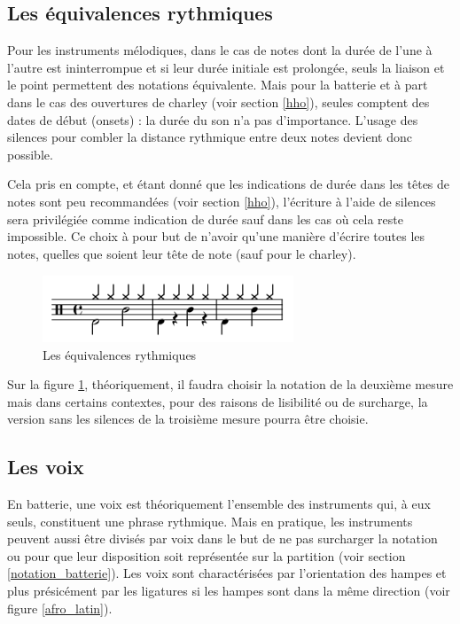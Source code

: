 \subsection*{Les équivalences rythmiques}
Pour les instruments mélodiques, dans le cas de notes dont la durée de l’une à
l’autre est ininterrompue et si leur durée initiale est prolongée, seuls la
liaison et le point permettent des notations équivalente. Mais pour la
batterie et à part dans le cas des ouvertures de charley (voir section
\ref{hho}), seules comptent des dates de début (onsets) : la durée du son n’a
pas d’importance. L’usage des silences pour combler la distance rythmique entre
deux notes devient donc possible.

Cela pris en compte, et étant donné que les indications de durée dans les têtes
de notes sont peu recommandées (voir section \ref{hho}), l’écriture à l’aide de
silences sera privilégiée comme indication de durée sauf dans les cas où cela
reste impossible. Ce choix à pour but de n’avoir qu’une manière d’écrire toutes
les notes, quelles que soient leur tête de note (sauf pour le charley).

\begin{figure}[h]
	\centering
	\includegraphics[height=20mm, width=75mm]{
    z_images/3_methodes/0_notation_de_la_batterie/6_equivalence.png}
	\caption{Les équivalences rythmiques}
	\label{equivalence}
\end{figure}

Sur la figure \ref{equivalence}, théoriquement, il faudra choisir la notation
de la deuxième mesure mais dans certains contextes, pour des raisons de
lisibilité ou de surcharge, la version sans les silences de la troisième mesure
pourra être choisie.

\subsection*{Les voix}


En batterie, une voix est théoriquement l’ensemble des instruments qui, à eux
seuls, constituent une phrase rythmique. Mais en pratique, les instruments
peuvent aussi être divisés par voix dans le but de ne pas surcharger la
notation ou pour que leur disposition soit représentée sur la
partition (voir section \ref{notation_batterie}).
Les voix sont charactérisées par l’orientation des hampes et plus présicément
par les ligatures si les hampes sont dans la même direction (voir figure
\ref{afro_latin}).


